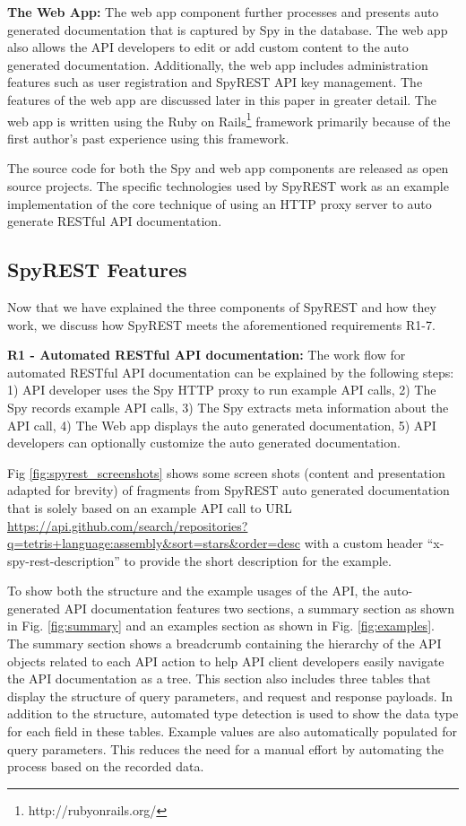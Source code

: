 \documentclass[conference]{IEEEtran}
\begin{document}
\textbf{The Web App:} The web app component further processes and presents auto generated documentation that is captured by Spy in the database. The web app also allows the API developers to edit or add custom content to the auto generated documentation. Additionally, the web app includes administration features such as user registration and SpyREST API key management. The features of the web app are discussed later in this paper in greater detail. The web app is written using the Ruby on Rails\footnote{http://rubyonrails.org/} framework primarily because of the first author's past experience using this framework.

The source code for both the Spy and web app components are released as open source projects. The specific technologies used by SpyREST work as an example implementation of the core technique of using an HTTP proxy server to auto generate RESTful API documentation.

\subsection{SpyREST Features} %

Now that we have explained the three components of SpyREST and how they work, we discuss how SpyREST meets the aforementioned requirements R1-7.

\textbf{R1 - Automated RESTful API documentation:} The work flow for automated RESTful API documentation can be explained by the following steps: 1) API developer uses the Spy HTTP proxy to run example API calls, 2) The Spy records example API calls, 3) The Spy extracts meta information about the API call, 4) The Web app displays the auto generated documentation, 5) API developers can optionally customize the auto generated documentation.

Fig \ref{fig:spyrest_screenshots} shows some screen shots  (content and presentation adapted for brevity) of fragments from SpyREST auto generated documentation that is solely based on an example API call to URL \url{https://api.github.com/search/repositories?q=tetris+language:assembly&sort=stars&order=desc} with a custom header ``x-spy-rest-description'' to provide the short description for the example.

To show both the structure and the example usages of the API, the auto-generated API documentation features two sections, a summary section as shown in Fig. \ref{fig:summary} and an examples section as shown in Fig. \ref{fig:examples}. The summary section shows a breadcrumb containing the hierarchy of the API objects related to each API action to help API client developers easily navigate the API documentation as a tree. This section also includes three tables that display the structure of query parameters, and request and response payloads. In addition to the structure, automated type detection is used to show the data type for each field in these tables. Example values are also automatically populated for query parameters. This reduces the need for a manual effort by automating the process based on the recorded data.
\end{document}
